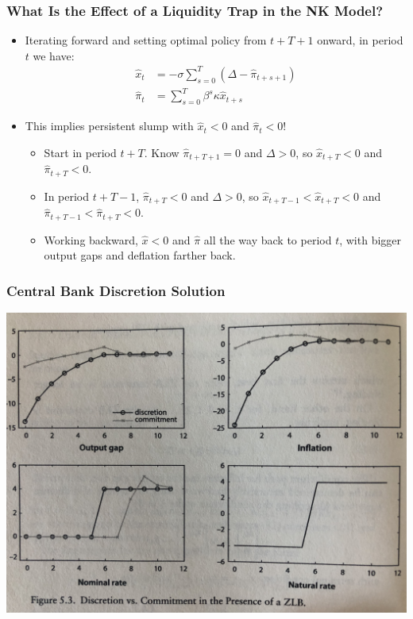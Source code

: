 \documentclass[english,xcolor=svgnames]{beamer}
\begin{document}
\begin{frame}
\frametitle{What Is the Effect of a Liquidity Trap in the NK Model?}
\begin{itemize}
	\item Iterating forward and setting optimal policy from $t + T + 1$ onward, in period $t$ we have:
	\begin{align*}
		\hat{x}_t &= -\sigma \sum_{s=0}^{T}(\Delta-\hat{\pi}_{t+s+1}) \\
		\hat{\pi}_t&=\sum_{s=0}^{T}\beta^s \kappa \hat{x}_{t+s}
	\end{align*}
	\item This implies persistent slump with $\hat{x}_{t}<0$ and $\hat{\pi}_{t}<0$!
	\begin{itemize}
		\item Start in period $t+T$. Know $\hat{\pi}_{t+T+1}=0$ and $\Delta>0$, so $\hat{x}_{t+T}<0$ and $\hat{\pi}_{t+T}<0$.
		\item In period $t+T-1$, $\hat{\pi}_{t+T}<0$ and $\Delta>0$, so $\hat{x}_{t+T-1}<\hat{x}_{t+T}<0$ and $\hat{\pi}_{t+T-1}<\hat{\pi}_{t+T}<0$.
		\item Working backward, $\hat{x}<0$ and $\hat{\pi}$ all the way back to period $t$, with bigger output gaps and deflation farther back.
	\end{itemize}
\end{itemize}
\end{frame}

\begin{frame}
\frametitle{Central Bank Discretion Solution}
\centering
\includegraphics[scale=0.075]{../../Images/Gali2018irfZLB.jpeg}
\end{frame}
\end{document}
